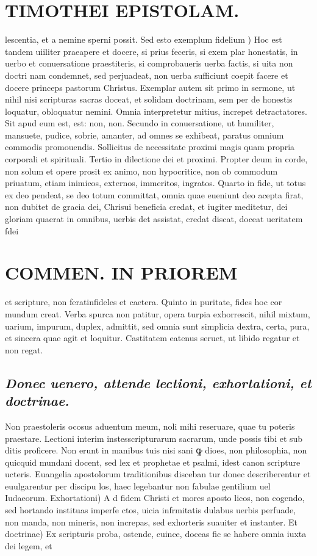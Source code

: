 \documentclass{article}
\begin{document}
\begin{pages}
\section*{TIMOTHEI EPISTOLAM. }
\marginpar{[ p.109 ]}\pstart lescentia, et a nemine sperni possit.  \pend\pstart Sed esto exemplum fidelium ) Hoc est tandem uiiliter praeapere et docere, si prius feceris, si exem plar honestatis, in uerbo et conuersatione praestiteris, si comprobaueris uerba factis, si uita non doctri nam condemnet, sed perjuadeat, non uerba sufficiunt coepit facere et docere princeps pastorum Christus. Exemplar autem sit primo in sermone, ut nihil nisi scripturas sacras doceat, et solidam doctrinam, sem per de honestis loquatur, obloquatur nemini. Omnia interpretetur mitius, increpet detractatores. Sit apud eum est, est: non, non. Secundo in conuersatione, ut humiliter, mansuete, pudice, sobrie, amanter, ad omnes se exhibeat, paratus omnium commodis promouendis. Sollicitus de necessitate proximi magis quam propria corporali et spirituali. Tertio in dilectione dei et proximi. Propter deum in corde, non solum et opere prosit ex animo, non hypocritice, non ob commodum priuatum, etiam inimicos, externos, immeritos, ingratos. Quarto in fide, ut totus ex deo pendeat, se deo totum committat, omnia quae eueniunt deo acepta firat, non dubitet de gracia dei, Chrisui beneficia credat, et iugiter meditetur, dei gloriam quaerat in omnibus, uerbis det assistat, credat discat, doceat ueritatem fdei  \pend
\section*{COMMEN. IN PRIOREM }
\marginpar{[ p.110 ]}\pstart et scripture, non feratinfideles et caetera. Quinto in puritate, fides hoc cor mundum creat. Verba spurca non patitur, opera turpia exhorrescit, nihil mixtum, uarium, impurum, duplex, admittit, sed omnia sunt simplicia dextra, certa, pura, et sincera quae agit et loquitur. Castitatem eatenus seruet, ut libido regatur et non regat.  \pend
{}
{}
\subsection*{\textit{Donec uenero, attende lectioni, exhortationi, et doctrinae. }}\pstart Non praestoleris ocosus aduentum meum, noli mihi reseruare, quae tu poteris praestare. Lectioni interim instesscripturarum sacrarum, unde possis tibi et sub ditis proficere. Non erunt in manibus tuis nisi sani ꝙ dioes, non philosophia, non quicquid mundani docent, sed lex et prophetae et psalmi, idest canon scripture ucteris. Euangelia apostolorum traditionibus disceban tur donec describerentur et euulgarentur per discipu los, haec legebantur non fabulae gentilium uel Iudaeorum.  \pend\pstart Exhortationi) A d fidem Christi et mores aposto licos, non cogendo, sed hortando instituas imperfe ctos, uicia infrmitatis dulabus uerbis perfuade, non manda, non mineris, non increpas, sed exhorteris suauiter et instanter.  \pend\pstart Et doctrinae) Ex scripturis proba, ostende, cuince, doceas fic se habere omnia iuxta dei legem, et  \pend

\end{pages}
\end{document}
